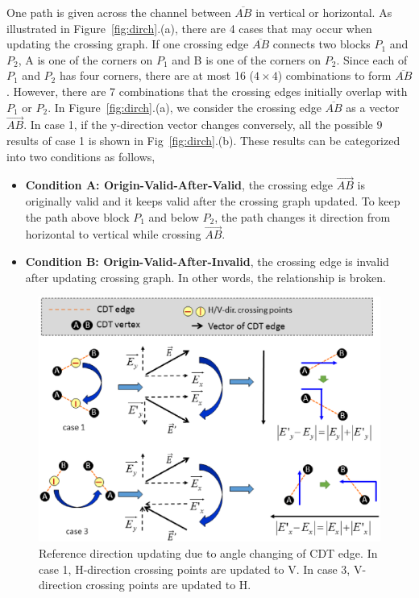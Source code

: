      
    One path is given across the channel between $\overline{AB}$ in vertical or horizontal. As illustrated in Figure~\ref{fig:dirch}.(a), there are 4 cases that may occur when updating the crossing graph. If one crossing edge $\overline{AB}$ connects two blocks $P_1$ and $P_2$, A is one of the corners on $P_1$ and B is one of the corners on $P_2$. Since each of $P_1$ and $P_2$ has four corners, there are at most 16 ($4\times 4$) combinations to form $\overline{AB}$. However, there are 7 combinations that the crossing edges initially overlap with $P_1$ or $P_2$. In Figure~\ref{fig:dirch}.(a), we consider the crossing edge $\overline{AB}$ as a vector $\overrightarrow{AB}$. In case 1, if the y-direction vector changes conversely, all the possible 9 results of case 1 is shown in Fig~\ref{fig:dirch}.(b). These results can be categorized into two conditions as follows,
    \begin{itemize}
      \item{\bf Condition A: Origin-Valid-After-Valid}, the crossing edge $\overrightarrow{AB}$ is originally valid and it keeps valid after the crossing graph updated. To keep the path above block $P_1$ and below $P_2$, the path changes it direction from horizontal to vertical while crossing $\overrightarrow{AB}$.
      \item{\bf Condition B: Origin-Valid-After-Invalid}, the crossing edge is invalid after updating crossing graph. In other words, the relationship is broken.
    \end{itemize}

    \begin{figure}[t]
      \begin{center}
        \includegraphics[width=\textwidth]{Fig/refdir3.eps}
        \caption{Reference direction updating due to angle changing of CDT edge.
         In case 1, H-direction crossing points are updated to V. 
           In case 3, V-direction crossing points are updated to H.}
        \label{fig:refdir}
      \end{center}
    \end{figure}

